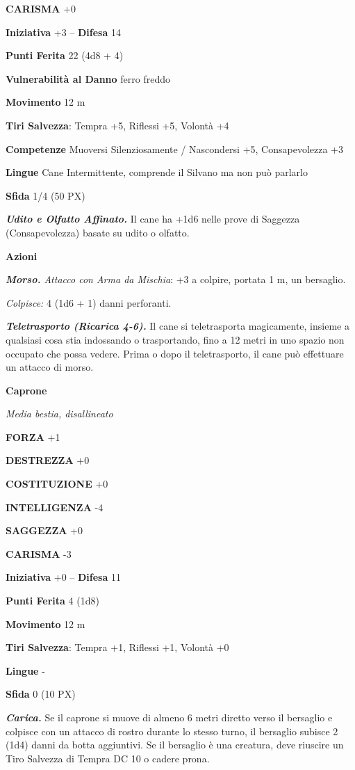 \begin{multicols}{2}
	\textbf{CARISMA} +0

	\textbf{Iniziativa} +3 -- \textbf{Difesa} 14

	\textbf{Punti Ferita} 22 (4d8 + 4)

	\textbf{Vulnerabilità al Danno} ferro freddo

	\textbf{Movimento} 12 m

	\textbf{Tiri Salvezza}: Tempra +5, Riflessi +5, Volontà +4

	\textbf{Competenze} Muoversi Silenziosamente / Nascondersi +5, Consapevolezza +3

	\textbf{Lingue} Cane Intermittente, comprende il Silvano ma non può parlarlo

	\textbf{Sfida} 1/4 (50 PX)

	\textit{\textbf{Udito e Olfatto Affinato.}} Il cane ha +1d6 nelle prove di Saggezza (Consapevolezza) basate su udito o olfatto.

	\textbf{Azioni}

	\textit{\textbf{Morso.} Attacco con Arma da Mischia}: +3 a colpire, portata 1 m, un bersaglio.

	\textit{Colpisce:} 4 (1d6 + 1) danni perforanti.

	\textit{\textbf{Teletrasporto (Ricarica 4-6).}} Il cane si teletrasporta magicamente, insieme a qualsiasi cosa stia indossando o trasportando, fino a 12 metri in uno spazio non occupato che possa vedere. Prima o dopo il teletrasporto, il cane può effettuare un attacco di morso.

	\medskip\textbf{Caprone}

	\textit{Media bestia, disallineato}

	\textbf{FORZA} +1

	\textbf{DESTREZZA} +0

	\textbf{COSTITUZIONE} +0

	\textbf{INTELLIGENZA} -4

	\textbf{SAGGEZZA} +0

	\textbf{CARISMA} -3

	\textbf{Iniziativa} +0 -- \textbf{Difesa} 11

	\textbf{Punti Ferita} 4 (1d8)

	\textbf{Movimento} 12 m

	\textbf{Tiri Salvezza}: Tempra +1, Riflessi +1, Volontà +0

	\textbf{Lingue} -

	\textbf{Sfida} 0 (10 PX)

	\textit{\textbf{Carica.}} Se il caprone si muove di almeno 6 metri diretto verso il bersaglio e colpisce con un attacco di rostro durante lo stesso turno, il bersaglio subisce 2 (1d4) danni da botta aggiuntivi. Se il bersaglio è una creatura, deve riuscire un Tiro Salvezza di Tempra DC 10
	o cadere prona.


\end{multicols}
